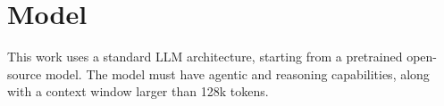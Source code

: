 \section{Model}

This work uses a standard LLM architecture, starting from a pretrained open-source model. The model must have agentic and reasoning capabilities, along with a context window larger than 128k tokens.
